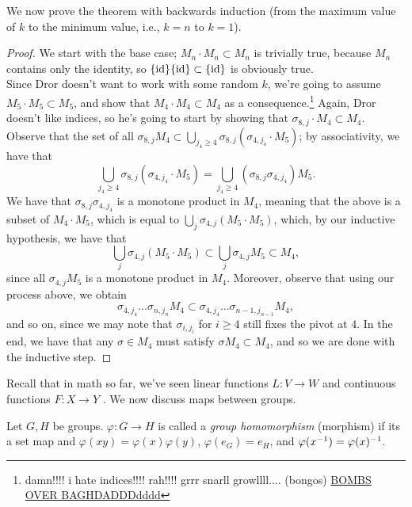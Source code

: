 \noindent We now prove the theorem with backwards induction (from the maximum value of $k$ to the minimum value, i.e., $k = n$ to $k = 1$).
\begin{proof}
    We start with the base case; $M_n \cdot M_n \subset M_n$ is trivially true, because $M_n$ contains only the identity, so $\{\mathrm{id}\} \{\mathrm{id}\} \subset \{\mathrm{id}\}$ is obviously true.
    \\[8pt]
    Since Dror doesn't want to work with some random $k$, we're going to assume $M_5 \cdot M_5 \subset M_5$, and show that $M_4 \cdot M_4 \subset M_4$ as a consequence.\footnote{damn!!!! i hate indices!!!! rah!!!! grrr snarll growllll.... (bongos) \href{https://osu.ppy.sh/beatmapsets/1981082\#osu/4113668}{BOMBS OVER BAGHDADDDdddd}} Again, Dror doesn't like indices, so he's going to start by showing that $\sigma_{8, j} \cdot M_4 \subset M_4$. Observe that the set of all $\sigma_{8, j} M_4 \subset \bigcup_{j_4 \geq 4} \sigma_{8, j} \left(\sigma_{4, j_4} \cdot M_5\right)$; by associativity, we have that
    \[ \bigcup_{j_4 \geq 4} \sigma_{8, j} \left(\sigma_{4, j_4} \cdot M_5\right) = \bigcup_{j_4 \geq 4} \left(\sigma_{8,j} \sigma_{4,j_4}\right) M_5. \]
    We have that $\sigma_{8,j} \sigma_{4,j_4}$ is a monotone product in $M_4$, meaning that the above is a subset of $M_4 \cdot M_5$, which is equal to $\bigcup_j \sigma_{4,j} (M_5 \cdot M_5)$, which, by our inductive hypothesis, we have that
    \[ \bigcup_j \sigma_{4,j} (M_5 \cdot M_5) \subset \bigcup_j \sigma_{4,j} M_5 \subset M_4, \]
    since all $\sigma_{4,j} M_5$ is a monotone product in $M_4$. Moreover, observe that using our process above, we obtain
    \[ \sigma_{4,j_4} \dots \sigma_{n,j_n} M_4 \subset \sigma_{4,j_4} \dots \sigma_{n-1,j_{n-1}} M_4, \]
    and so on, since we may note that $\sigma_{i,j_i}$ for $i \geq 4$ still fixes the pivot at $4$. In the end, we have that any $\sigma \in M_4$ must satisfy $\sigma M_4 \subset M_4$, and so we are done with the inductive step.
\end{proof}
\hrulebar
\noindent Recall that in math so far, we've seen linear functions $L : V \to W$ and continuous functions $F : X \to Y$ . We now discuss maps between groups.
\begin{definition}
    Let $G, H$ be groups. $\varphi : G \to H$ is called a \textit{group homomorphism} (morphism) if its a set map and $\varphi(xy) = \varphi(x) \varphi(y)$, $\varphi(e_G) = e_H$, and $\varphi(x^{-1}) = \varphi(x)^{-1}$.
\end{definition}